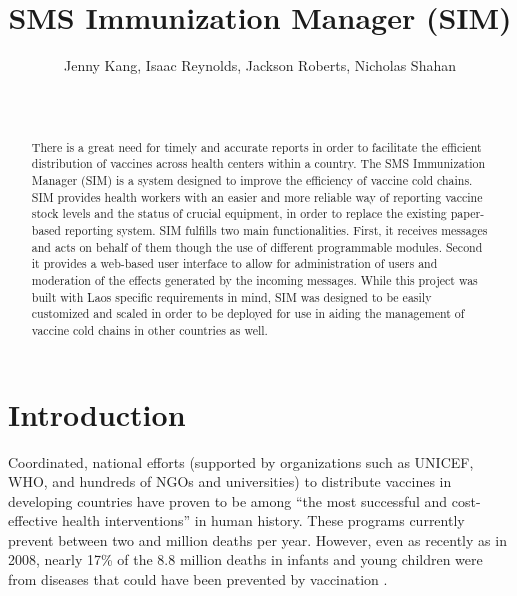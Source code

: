 \documentclass{acm_proc_article-sp}
\begin{document}
\title{SMS Immunization Manager (SIM)}

\author{
       Jenny Kang, Isaac Reynolds, Jackson Roberts, Nicholas Shahan\\
              \\
              \\
}

\maketitle
\begin{abstract}
There is a great need for timely and accurate reports in order to facilitate the efficient distribution of vaccines across health centers within a country. The SMS Immunization Manager (SIM) is a system designed to improve the efficiency of vaccine cold chains. SIM provides health workers with an easier and more reliable way of reporting vaccine stock levels and the status of crucial equipment, in order to replace the existing paper-based reporting system. SIM fulfills two main functionalities. First, it receives messages and acts on behalf of them though the use of different programmable modules. Second it provides a web-based user interface to allow for administration of users and moderation of the effects generated by the incoming messages. While this project was built with Laos specific requirements in mind, SIM was designed to be easily customized and scaled in order to be deployed for use in aiding the management of vaccine cold chains in other countries as well.  
\end{abstract}

\section{Introduction}
Coordinated, national efforts (supported by organizations such as UNICEF, WHO, and hundreds of NGOs and universities) to distribute vaccines in developing countries have proven to be among ``the most successful and cost-effective health interventions'' in human history. These programs currently prevent between two and million deaths per year. However, even as recently as in 2008, nearly 17\% of the 8.8 million deaths in infants and young children were from diseases that could have been prevented by vaccination \cite{who:campaign_essentials}. 
\end{document}
